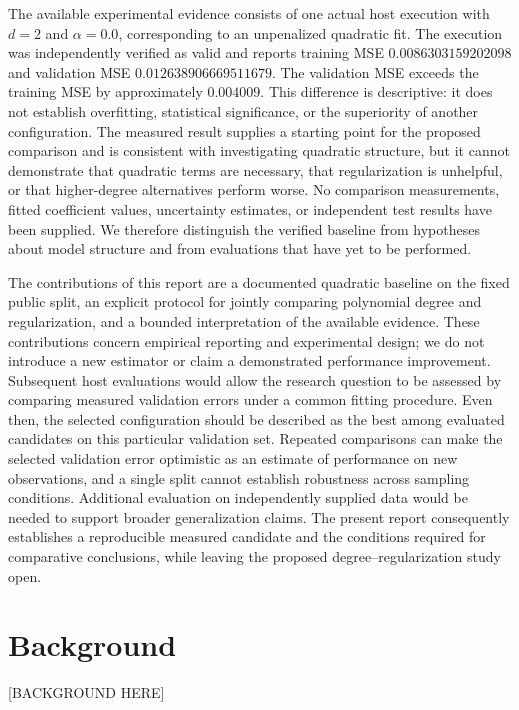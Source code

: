 \documentclass[11pt]{article}
\begin{document}
The available experimental evidence consists of one actual host execution with \(d=2\) and \(\alpha=0.0\), corresponding to an unpenalized quadratic fit. The execution was independently verified as valid and reports training MSE \(0.0086303159202098\) and validation MSE \(0.012638906669511679\). The validation MSE exceeds the training MSE by approximately \(0.004009\). This difference is descriptive: it does not establish overfitting, statistical significance, or the superiority of another configuration. The measured result supplies a starting point for the proposed comparison and is consistent with investigating quadratic structure, but it cannot demonstrate that quadratic terms are necessary, that regularization is unhelpful, or that higher-degree alternatives perform worse. No comparison measurements, fitted coefficient values, uncertainty estimates, or independent test results have been supplied. We therefore distinguish the verified baseline from hypotheses about model structure and from evaluations that have yet to be performed.

The contributions of this report are a documented quadratic baseline on the fixed public split, an explicit protocol for jointly comparing polynomial degree and regularization, and a bounded interpretation of the available evidence. These contributions concern empirical reporting and experimental design; we do not introduce a new estimator or claim a demonstrated performance improvement. Subsequent host evaluations would allow the research question to be assessed by comparing measured validation errors under a common fitting procedure. Even then, the selected configuration should be described as the best among evaluated candidates on this particular validation set. Repeated comparisons can make the selected validation error optimistic as an estimate of performance on new observations, and a single split cannot establish robustness across sampling conditions. Additional evaluation on independently supplied data would be needed to support broader generalization claims. The present report consequently establishes a reproducible measured candidate and the conditions required for comparative conclusions, while leaving the proposed degree--regularization study open.

\section{Background}
[BACKGROUND HERE]
\end{document}
